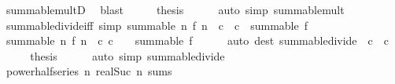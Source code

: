 \begin{isabellebody}
\ summable{\isacharunderscore}{\kern0pt}mult{\isacharunderscore}{\kern0pt}D\ \isamarkupfalse%
\ blast\isanewline
\ \ \isamarkupfalse%
\ \isamarkupfalse%
\ {\isacharquery}{\kern0pt}thesis\isanewline
\ \ \ \ \isamarkupfalse%
\ {\isacharparenleft}{\kern0pt}auto\ simp{\isacharcolon}{\kern0pt}\ summable{\isacharunderscore}{\kern0pt}mult{\isacharparenright}{\kern0pt}\isanewline
{}\isamarkupfalse%
%
\endisatagproof
{\isafoldproof}%
%
\isadelimproof
\isanewline
%
\endisadelimproof
\isanewline
{}\isamarkupfalse%
\ summable{\isacharunderscore}{\kern0pt}divide{\isacharunderscore}{\kern0pt}iff\ {\isacharbrackleft}{\kern0pt}simp{\isacharbrackright}{\kern0pt}{\isacharcolon}{\kern0pt}\ {\isachardoublequoteopen}summable\ {\isacharparenleft}{\kern0pt}{\isasymlambda}n{\isachardot}{\kern0pt}\ f\ n\ {\isacharslash}{\kern0pt}\ c{\isacharparenright}{\kern0pt}\ {\isasymlongleftrightarrow}\ c{\isacharequal}{\kern0pt}{}\ {\isasymor}\ summable\ f{\isachardoublequoteclose}\isanewline
%
\isadelimproof
%
\endisadelimproof
%
\isatagproof
{}\isamarkupfalse%
\ {\isacharminus}{\kern0pt}\isanewline
\ \ \isamarkupfalse%
\ {\isachardoublequoteopen}{\isasymlbrakk}summable\ {\isacharparenleft}{\kern0pt}{\isasymlambda}n{\isachardot}{\kern0pt}\ f\ n\ {\isacharslash}{\kern0pt}\ c{\isacharparenright}{\kern0pt}{\isacharsemicolon}{\kern0pt}\ c\ {\isasymnoteq}\ {}{\isasymrbrakk}\ {\isasymLongrightarrow}\ summable\ f{\isachardoublequoteclose}\isanewline
\ \ \ \ \isamarkupfalse%
\ {\isacharparenleft}{\kern0pt}auto\ dest{\isacharcolon}{\kern0pt}\ summable{\isacharunderscore}{\kern0pt}divide\ {\isacharbrackleft}{\kern0pt}\ c\ {\isacharequal}{\kern0pt}\ {\isachardoublequoteopen}{}{\isacharslash}{\kern0pt}c{\isachardoublequoteclose}{\isacharbrackright}{\kern0pt}{\isacharparenright}{\kern0pt}\isanewline
\ \ \isamarkupfalse%
\ \isamarkupfalse%
\ {\isacharquery}{\kern0pt}thesis\isanewline
\ \ \ \ \isamarkupfalse%
\ {\isacharparenleft}{\kern0pt}auto\ simp{\isacharcolon}{\kern0pt}\ summable{\isacharunderscore}{\kern0pt}divide{\isacharparenright}{\kern0pt}\isanewline
{}\isamarkupfalse%
%
\endisatagproof
{\isafoldproof}%
%
\isadelimproof
\isanewline
%
\endisadelimproof
\isanewline
{}\isamarkupfalse%
\isanewline
\isanewline
{}\isamarkupfalse%
\ power{\isacharunderscore}{\kern0pt}half{\isacharunderscore}{\kern0pt}series{\isacharcolon}{\kern0pt}\ {\isachardoublequoteopen}{\isacharparenleft}{\kern0pt}{\isasymlambda}n{\isachardot}{\kern0pt}\ {\isacharparenleft}{\kern0pt}{}{\isacharslash}{\kern0pt}{}{\isacharcolon}{\kern0pt}{\isacharcolon}{\kern0pt}real{\isacharparenright}{\kern0pt}{\isacharcircum}{\kern0pt}Suc\ n{\isacharparenright}{\kern0pt}\ sums\ {}{\isachardoublequoteclose}\isanewline

\end{isabellebody}
